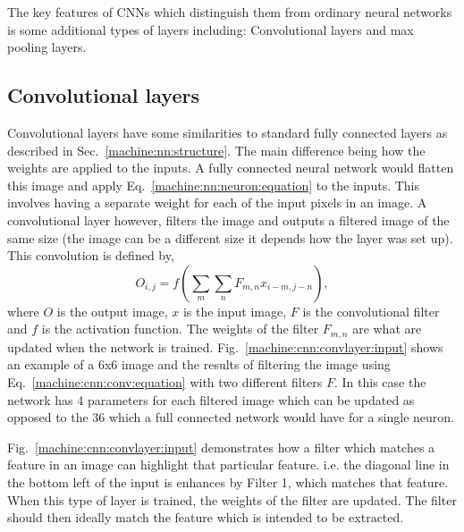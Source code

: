 The key features of \glspl{CNN} which distinguish them from ordinary neural networks is some additional types of layers including: Convolutional layers and max pooling layers. 


\subsection{Convolutional layers}

Convolutional layers have some similarities to standard fully connected layers as described in Sec.~\ref{machine:nn:structure}. 
The main difference being how the weights are applied to the inputs.
A fully connected neural network would flatten this image and apply Eq.~\ref{machine:nn:neuron:equation} to the inputs.
This involves having a separate weight for each of the input pixels in an image.
A convolutional layer however, filters the image and outputs a filtered image of the same size (the image can be a different size it depends how the layer was set up).
This convolution is defined by,
\begin{equation}
\label{machine:cnn:conv:equation}
O_{i,j} = f\left( \sum_{m} \sum_{n} F_{m,n}x_{i-m,j-n}\right) ,
\end{equation}
where $O$ is the output image, $x$ is the input image, $F$ is the convolutional filter and $f$ is the activation function.
The weights of the filter $F_{m,n}$ are what are updated when the network is trained.
Fig.~\ref{machine:cnn:convlayer:input} shows an example of a 6x6 image and the results of filtering the image using Eq.~\ref{machine:cnn:conv:equation} with two different filters $F$. 
In this case the network has 4 parameters for each filtered image which can be updated as opposed to the 36 which a full connected network would have for a single neuron.

Fig.~\ref{machine:cnn:convlayer:input} demonstrates how a filter which matches a feature in an image can highlight that particular feature. 
i.e. the diagonal line in the bottom left of the input is enhances by Filter 1, which matches that feature. 
When this type of layer is trained, the weights of the filter are updated. The filter should then ideally match the feature which is intended to be extracted.

